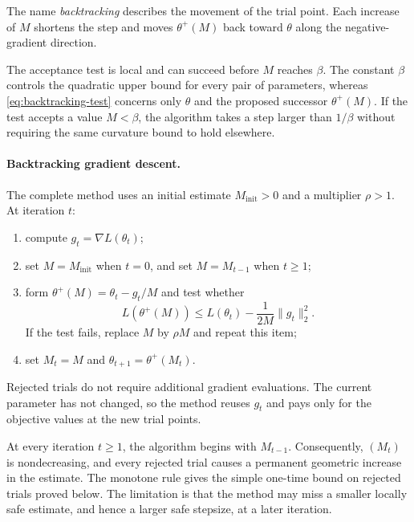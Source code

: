 \documentclass[11pt,twoside]{article}
\theoremstyle{definition}
\theoremstyle{remark}
\begin{document}
The name \emph{backtracking} describes the movement of the trial point. Each
increase of $M$ shortens the step and moves $\theta^+(M)$ back toward
$\theta$ along the negative-gradient direction.

The acceptance test is local and can succeed before $M$ reaches $\beta$. The
constant $\beta$ controls the quadratic upper bound for every pair of
parameters, whereas \cref{eq:backtracking-test} concerns only $\theta$ and the
proposed successor $\theta^+(M)$. If the test accepts a value $M<\beta$, the
algorithm takes a step larger than $1/\beta$ without requiring the same
curvature bound to hold elsewhere.

\paragraph{Backtracking gradient descent.}
The complete method uses an initial estimate $M_{\mathrm{init}}>0$ and a
multiplier $\rho>1$. At iteration $t$:
\begin{enumerate}[(1),leftmargin=*]
\item compute $g_t=\nabla L(\theta_t)$;
\item set $M=M_{\mathrm{init}}$ when $t=0$, and set $M=M_{t-1}$ when
$t\ge1$;
\item form $\theta^+(M)=\theta_t-g_t/M$ and test whether
\[
 L(\theta^+(M))
 \le L(\theta_t)-\frac1{2M}\|g_t\|_2^2.
\]
If the test fails, replace $M$ by $\rho M$ and repeat this item;
\item set $M_t=M$ and $\theta_{t+1}=\theta^+(M_t)$.
\end{enumerate}
Rejected trials do not require additional gradient evaluations. The current
parameter has not changed, so the method reuses $g_t$ and pays only for the
objective values at the new trial points.

At every iteration $t\ge1$, the algorithm begins with $M_{t-1}$.
Consequently, $(M_t)$ is nondecreasing, and every rejected trial causes a
permanent geometric increase in the estimate. The monotone rule gives the
simple one-time bound on rejected trials proved below. The limitation is that
the method may miss a smaller locally safe estimate, and hence a larger safe
stepsize, at a later iteration.
\end{document}
